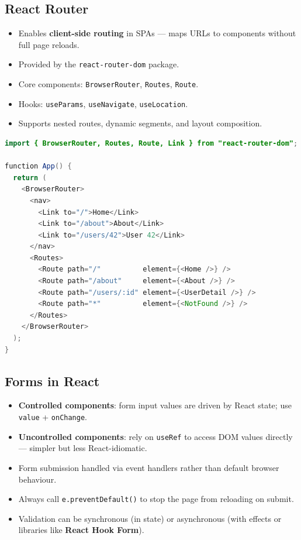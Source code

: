 \documentclass[hidelinks]{article}
\begin{document}
\subsection{React Router}
\begin{itemize}
  \item Enables \textbf{client-side routing} in SPAs --- maps URLs to components without full page reloads.
  \item Provided by the \texttt{react-router-dom} package.
  \item Core components: \texttt{BrowserRouter}, \texttt{Routes}, \texttt{Route}.
  \item Hooks: \texttt{useParams}, \texttt{useNavigate}, \texttt{useLocation}.
  \item Supports nested routes, dynamic segments, and layout composition.
\end{itemize}

\begin{lstlisting}[language=Java, caption={React Router v6 example}]
import { BrowserRouter, Routes, Route, Link } from "react-router-dom";

function App() {
  return (
    <BrowserRouter>
      <nav>
        <Link to="/">Home</Link>
        <Link to="/about">About</Link>
        <Link to="/users/42">User 42</Link>
      </nav>
      <Routes>
        <Route path="/"          element={<Home />} />
        <Route path="/about"     element={<About />} />
        <Route path="/users/:id" element={<UserDetail />} />
        <Route path="*"          element={<NotFound />} />
      </Routes>
    </BrowserRouter>
  );
}
\end{lstlisting}

\subsection{Forms in React}
\begin{itemize}
  \item \textbf{Controlled components}: form input values are driven by React state; use \texttt{value} + \texttt{onChange}.
  \item \textbf{Uncontrolled components}: rely on \texttt{useRef} to access DOM values directly --- simpler but less React-idiomatic.
  \item Form submission handled via event handlers rather than default browser behaviour.
  \item Always call \texttt{e.preventDefault()} to stop the page from reloading on submit.
  \item Validation can be synchronous (in state) or asynchronous (with effects or libraries like \textbf{React Hook Form}).
\end{itemize}
\end{document}
